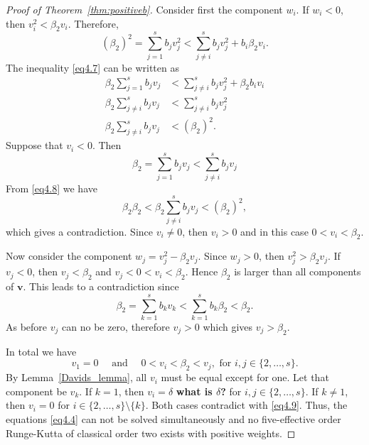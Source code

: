 \begin{proof}[Proof of Theorem~\ref{thm:positiveb}]
    Consider first the component \( w_{i} \). If \( w_{i} < 0 \), then \( v_{i}^{2} < \beta_{2}v_{i} \). Therefore,
    \begin{equation}\label{eq4.7}
        (\beta_{2})^{2} = \sum_{j=1}^{s}b_{j}v_{j}^{2} < \sum_{j \neq i}^{s}b_{j}v_{j}^{2} + b_{i}\beta_{2}v_{i}.
    \end{equation}
    The inequality \eqref{eq4.7} can be written as
    \begin{equation}\label{eq4.8}
        \begin{split}
            \beta_{2}\sum_{j=1}^{s}b_{j}v_{j} &< \sum_{j \neq i}^{s}b_{j}v_{j}^{2} + \beta_{2}b_{i}v_{i} \\
            \beta_{2}\sum_{j \neq i}^{s}b_{j}v_{j} &< \sum_{j \neq i}^{s}b_{j}v_{j}^{2} \\
            \beta_{2}\sum_{j \neq i}^{s}b_{j}v_{j} &< (\beta_{2})^{2}.
        \end{split}
    \end{equation}
    Suppose that \( v_{i} < 0 \). Then
    \begin{equation*}
        \beta_{2} = \sum_{j=1}^{s}b_{j}v_{j} < \sum_{j \neq i}^{s}b_{j}v_{j}
    \end{equation*}
    From \eqref{eq4.8} we have
    \begin{equation*}
            \beta_{2}\beta_{2} < \beta_{2}\sum_{j \neq i}^{s}b_{j}v_{j} < (\beta_{2})^{2},
    \end{equation*}
    which gives a contradiction. Since \( v_{i} \neq 0 \), then \( v_{i} > 0 \) and in this case \( 0 < v_{i} < \beta_{2} \).

    Now consider the component \( w_{j} = v_{j}^{2} - \beta_{2}v_{j} \). Since \( w_{j} > 0 \), then \( v_{j}^{2} > \beta_{2}v_{j} \). If \( v_{j} < 0 \), then \( v_{j} < \beta_{2} \) and \( v_{j} < 0 < v_{i} < \beta_{2} \). Hence \( \beta_{2} \) is larger than all components of \( \bm{v} \). This leads to a contradiction since
    \begin{equation*}
            \beta_{2} = \sum_{k=1}^{s}b_{k}v_{k} < \sum_{k=1}^{s}b_{k}\beta_{2} < \beta_{2}.
    \end{equation*}
    As before \( v_{j} \) can no be zero, therefore \( v_{j} > 0 \) which gives \( v_{j} > \beta_{2} \).

    In total we have
    \begin{equation}\label{eq4.9}
        v_{1} = 0 \quad \text{ and } \quad 0 < v_{i} < \beta_{2} < v_{j}, \text{ for } i,j \in \{2,\dots,s\}.
    \end{equation}
    By Lemma~\ref{Davids_lemma}, all \( v_{i} \) must be equal except for one. Let that component be \( v_{k} \). If \( k = 1 \), then \( v_{i} = \delta \) {\bf what is $\delta$?} for \( i,j \in \{2,\dots,s\} \). If \( k \neq 1 \), then \( v_{i} = 0 \) for \( i \in \{2,\dots,s\}\setminus\{k\} \). Both cases contradict with \eqref{eq4.9}. Thus, the equations \eqref{eq4.4} can not be solved simultaneously and no five-effective order Runge-Kutta of classical order two exists with positive weights.



\end{proof}
